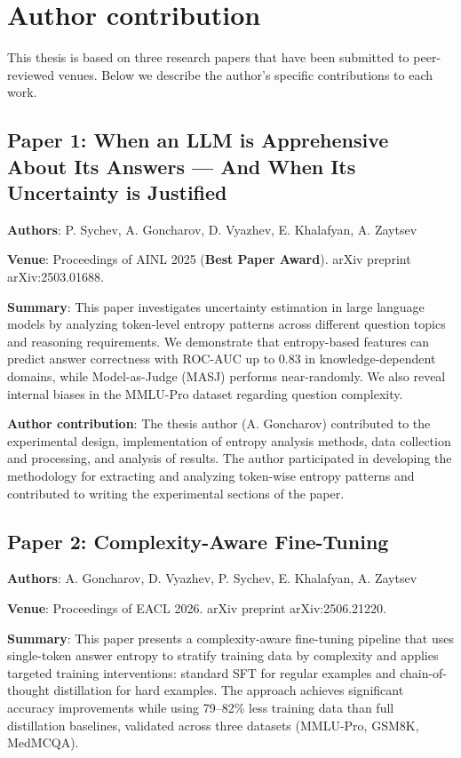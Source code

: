 \chapter{Author contribution}

This thesis is based on three research papers that have been submitted to peer-reviewed venues. Below we describe the author's specific contributions to each work.

\section*{Paper 1: When an LLM is Apprehensive About Its Answers --- And When Its Uncertainty is Justified}

\textbf{Authors}: P. Sychev, A. Goncharov, D. Vyazhev, E. Khalafyan, A. Zaytsev

\textbf{Venue}: Proceedings of AINL 2025 (\textbf{Best Paper Award}). arXiv preprint arXiv:2503.01688.

\textbf{Summary}: This paper investigates uncertainty estimation in large language models by analyzing token-level entropy patterns across different question topics and reasoning requirements. We demonstrate that entropy-based features can predict answer correctness with ROC-AUC up to 0.83 in knowledge-dependent domains, while Model-as-Judge (MASJ) performs near-randomly. We also reveal internal biases in the MMLU-Pro dataset regarding question complexity.

\textbf{Author contribution}: The thesis author (A. Goncharov) contributed to the experimental design, implementation of entropy analysis methods, data collection and processing, and analysis of results. The author participated in developing the methodology for extracting and analyzing token-wise entropy patterns and contributed to writing the experimental sections of the paper.

\section*{Paper 2: Complexity-Aware Fine-Tuning}

\textbf{Authors}: A. Goncharov, D. Vyazhev, P. Sychev, E. Khalafyan, A. Zaytsev

\textbf{Venue}: Proceedings of EACL 2026. arXiv preprint arXiv:2506.21220.

\textbf{Summary}: This paper presents a complexity-aware fine-tuning pipeline that uses single-token answer entropy to stratify training data by complexity and applies targeted training interventions: standard SFT for regular examples and chain-of-thought distillation for hard examples. The approach achieves significant accuracy improvements while using 79--82\% less training data than full distillation baselines, validated across three datasets (MMLU-Pro, GSM8K, MedMCQA).

